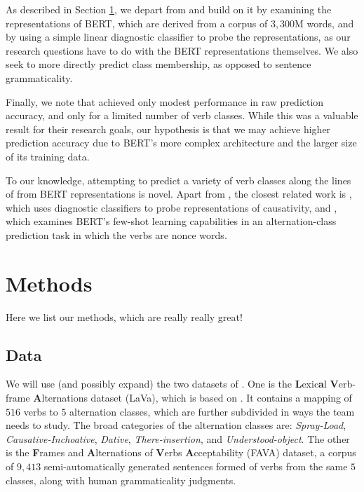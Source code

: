 \documentclass[11pt]{article}
\begin{document}
As described in Section \ref{sec:methods}, we depart from \citealt{kann2018verb} and build on it by examining the representations of BERT, which are derived from a corpus of $3,300$M words, and by using a simple linear diagnostic classifier to probe the representations, as our research questions have to do with the BERT representations themselves.  We also seek to more directly predict class membership, as opposed to sentence grammaticality.

Finally, we note that \citet{kann2018verb} achieved only modest performance in raw prediction accuracy, and only for a limited number of verb classes.  While this was a valuable result for their research goals, our hypothesis is that we may achieve higher prediction accuracy due to BERT's more complex architecture and the larger size of its training data.

To our knowledge, attempting to predict a variety of verb classes along the lines of \citealt{levin1993} from BERT representations is novel.  Apart from \citealt{kann2018verb}, the closest related work is \citealt{causativity-neurons}, which uses diagnostic classifiers to probe representations of causativity, and \citealt{thrush2020investigating}, which examines BERT's few-shot learning capabilities in an alternation-class prediction task in which the verbs are nonce words.

\section{Methods}
\label{sec:methods}
Here we list our methods, which are really really great!

\subsection{Data}
We will use (and possibly expand) the two datasets of \citet{kann2018verb}.  One is the \textbf{L}exic\textbf{a}l \textbf{V}erb-frame \textbf{A}lternations dataset (LaVa), which is based on \citet{levin1993}.  It contains a mapping of $516$ verbs to $5$ alternation classes, which are further subdivided in ways the team needs to study.  The broad categories of the alternation classes are: \emph{Spray-Load}, \emph{Causative-Inchoative}, \emph{Dative}, \emph{There-insertion}, and \emph{Understood-object}.  The other is the \textbf{F}rames and \textbf{A}lternations of \textbf{V}erbs \textbf{A}cceptability (FAVA) dataset, a corpus of $9,413$ semi-automatically generated sentences formed of verbs from the same $5$ classes, along with human grammaticality judgments.
\end{document}
